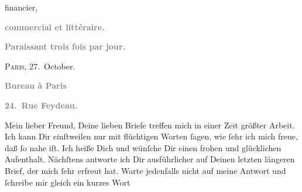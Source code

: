 \begin{ledgroupsized}[t]{13cm}
\begin{otherlanguage}{french}
{{                        financier,}}\end{otherlanguage}\pend
           \pstart
           \begin{otherlanguage}{french}\textcolor{gray}{\textbf{commercial et littéraire.}}\end{otherlanguage}\pend
           \pstart
           \begin{otherlanguage}{french}\textcolor{gray}{\textbf{\textbf{Paraissant trois fois par jour.}}}\end{otherlanguage}\hfill \textsc{Paris}, 27. October.\pend
           \pstart
           \begin{otherlanguage}{french}\textcolor{gray}{\textbf{\textbf{Bureau à Paris}}}\end{otherlanguage}\pend
           \pstart
           \begin{otherlanguage}{french}\textcolor{gray}{\textbf{\textbf{24. Rue Feydeau.}}}\end{otherlanguage}\pend
           \pstart{}Mein lieber Freund,\pend\pstart
           Deine lieben Briefe treffen mich in einer Zeit größter Arbeit. Ich kann Dir
               einſtweilen nur mit flüchtigen Worten ſagen, wie ſehr ich mich freue, daß \label{K_L02788-1v}\label{K_L02788-1h} ſo nahe iſt. Ich heiße Dich \label{K_L02788-2v}\label{K_L02788-2h} und wünſche Dir einen frohen
               und glücklichen Aufenthalt. Nächſtens antworte ich Dir ausführlicher auf Deinen
               letzten längeren Brief, der mich ſehr erfreut hat. {\pb}Warte jedenfalls nicht auf meine Antwort und ſchreibe mir gleich ein kurzes Wort

\end{ledgroupsized}
